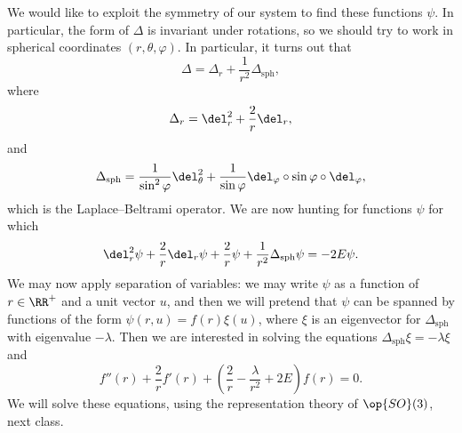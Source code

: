 \documentclass[../notes.tex]{subfiles}
\begin{document}
We would like to exploit the symmetry of our system to find these functions $\psi$. In particular, the form of $\Delta$ is invariant under rotations, so we should try to work in spherical coordinates $(r,\theta,\varphi)$. In particular, it turns out that
\[\Delta=\Delta_r+\frac1{r^2}\Delta_{\mathrm{sph}},\]
where
\[\Delta_r=\del_r^2+\frac2r\del_r,\]
and
\[\Delta_{\mathrm{sph}}=\frac1{\sin^2\varphi}\del_\theta^2+\frac1{\sin\varphi}\del_\varphi\circ\sin\varphi\circ\del_\varphi,\]
which is the Laplace--Beltrami operator. We are now hunting for functions $\psi$ for which
\[\del_r^2\psi+\frac2r\del_r\psi+\frac2r\psi+\frac1{r^2}\Delta_{\mathrm{sph}}\psi=-2E\psi.\]
We may now apply separation of variables: we may write $\psi$ as a function of $r\in\RR^+$ and a unit vector $u$, and then we will pretend that $\psi$ can be spanned by functions of the form $\psi(r,u)=f(r)\xi(u)$, where $\xi$ is an eigenvector for $\Delta_{\mathrm{sph}}$ with eigenvalue $-\lambda$. Then we are interested in solving the equations $\Delta_{\mathrm{sph}}\xi=-\lambda\xi$ and
\[f''(r)+\frac2rf'(r)+\left(\frac2r-\frac\lambda{r^2}+2E\right)f(r)=0.\]
We will solve these equations, using the representation theory of $\op{SO}(3)$, next class.
\end{document}
